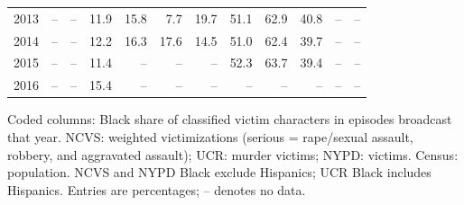\begin{center}
\begin{tabular}{@{}rrrrrrrrrrrr@{}}
2013 & -- & -- & 11.9 & 15.8 & 7.7 & 19.7 & 51.1 & 62.9 & 40.8 & -- & -- \\
2014 & -- & -- & 12.2 & 16.3 & 17.6 & 14.5 & 51.0 & 62.4 & 39.7 & -- & -- \\
2015 & -- & -- & 11.4 & -- & -- & -- & 52.3 & 63.7 & 39.4 & -- & -- \\
2016 & -- & -- & 15.4 & -- & -- & -- & -- & -- & -- & -- & -- \\
\bottomrule
\end{tabular}
\par\smallskip
\parbox{\linewidth}{\footnotesize Coded columns: Black share of classified victim characters in episodes broadcast that year. NCVS: weighted victimizations (serious = rape/sexual assault, robbery, and aggravated assault); UCR: murder victims; NYPD: victims. Census: population. NCVS and NYPD Black exclude Hispanics; UCR Black includes Hispanics. Entries are percentages; -- denotes no data.}
\end{center}

